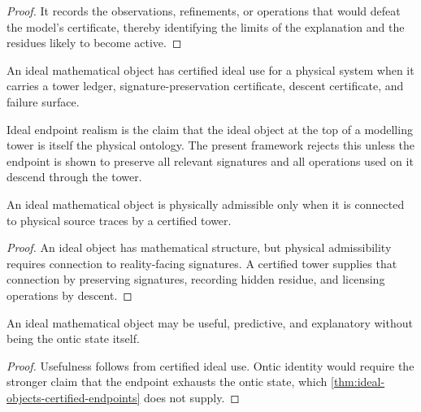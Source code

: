 \begin{proof}
It records the observations, refinements, or operations that would defeat the model's certificate, thereby identifying the limits of the explanation and the residues likely to become active.
\end{proof}

\begin{definition}
\label{def:certified-ideal-use}
An ideal mathematical object has certified ideal use for a physical system when it carries a tower ledger, signature-preservation certificate, descent certificate, and failure surface.
\end{definition}

\begin{definition}
\label{def:ideal-endpoint-realism}
Ideal endpoint realism is the claim that the ideal object at the top of a modelling tower is itself the physical ontology. The present framework rejects this unless the endpoint is shown to preserve all relevant signatures and all operations used on it descend through the tower.
\end{definition}

\begin{theorem}
\label{thm:ideal-objects-certified-endpoints}
An ideal mathematical object is physically admissible only when it is connected to physical source traces by a certified tower.
\end{theorem}

\begin{proof}
An ideal object has mathematical structure, but physical admissibility requires connection to reality-facing signatures. A certified tower supplies that connection by preserving signatures, recording hidden residue, and licensing operations by descent.
\end{proof}

\begin{corollary}
\label{cor:usefulness-not-ideal-ontology}
An ideal mathematical object may be useful, predictive, and explanatory without being the ontic state itself.
\end{corollary}

\begin{proof}
Usefulness follows from certified ideal use. Ontic identity would require the stronger claim that the endpoint exhausts the ontic state, which \autoref{thm:ideal-objects-certified-endpoints} does not supply.
\end{proof}

